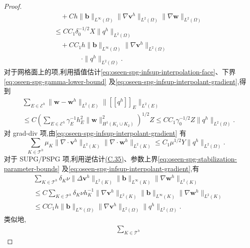 \begin{proof}
\begin{equation*}
\begin{aligned}
 &\quad+Ch\|\bm{b}\|_{L^\infty(\Omega)}
          \|\nabla\bm{v}^h\|_{L^2(\Omega)}
          \|\nabla\bm{w}\|_{L^2(\Omega)}\\
 &\le CC_1\delta_0^{-1/2}X\|q^h\|_{L^2(\Omega)}\\
 &\quad+CC_1h\|\bm{b}\|_{L^\infty(\Omega)}
          \|\nabla\bm{v}^h\|_{L^2(\Omega)}\\
 &\hspace{4em}\cdot\|q^h\|_{L^2(\Omega)}.
\end{aligned}
\end{equation*}
对于网格面上的项,利用插值估计\cref{eq:oseen-spg-infsup-interpolation-face}、下界\cref{eq:oseen-spg-gamma-lower-bound} 及\cref{eq:oseen-spg-infsup-interpolant-gradient},得到
\begin{equation*}
\begin{aligned}
 &\sum_{E\in\mathcal{E}^h}
       \|\bm{w}-\bm{w}^h\|_{L^2(E)}
       \|[\![q^h]\!]_E\|_{L^2(E)}\\
 &\le C\left(\sum_{E\in\mathcal{E}^h}
        \gamma_E^{-1}h_E^2
        \|\bm{w}\|_{H^1(K_1\cup K_2)}^2\right)^{1/2}Z
 \le CC_1\gamma_0^{-1/2}Z\|q^h\|_{L^2(\Omega)}.
\end{aligned}
\end{equation*}
对 grad-div 项,由\cref{eq:oseen-spg-infsup-interpolant-gradient} 有
\begin{equation*}
 \sum_{K\in\mathcal{T}^h}
       \mu_K\|\nabla\cdot\bm{v}^h\|_{L^2(K)}
             \|\nabla\cdot\bm{w}^h\|_{L^2(K)}
 \le C_1\mu^{1/2}Y\|q^h\|_{L^2(\Omega)}.
\end{equation*}
对于 SUPG/PSPG 项,利用逆估计\hyperref[eq:appendix-c-35]{(C.35)}、参数上界\cref{eq:oseen-spg-stabilization-parameter-bounds} 及\cref{eq:oseen-spg-infsup-interpolant-gradient},有
\begin{equation*}
\begin{aligned}
 &\sum_{K\in\mathcal{T}^h}
     \delta_K\nu\|\Delta\bm{v}^h\|_{L^2(K)}
       \|\bm{b}\|_{L^\infty(K)}
       \|\nabla\bm{w}^h\|_{L^2(K)}\\
 &\le C\sum_{K\in\mathcal{T}^h}
       \delta_K\nu h_K^{-1}
       \|\nabla\bm{v}^h\|_{L^2(K)}
       \|\bm{b}\|_{L^\infty(K)}
       \|\nabla\bm{w}^h\|_{L^2(K)}\\
 &\le CC_1h\|\bm{b}\|_{L^\infty(\Omega)}
       \|\nabla\bm{v}^h\|_{L^2(\Omega)}
       \|q^h\|_{L^2(\Omega)}.
\end{aligned}
\end{equation*}
类似地,
\begin{align*}
 &\sum_{K\in\mathcal{T}^h}

\end{align*}
\end{proof}
